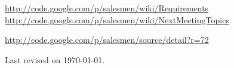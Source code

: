 \documentclass[a4paper, 12pt]{article}
\begin{document}
			
		
	
	
	\begin{thebibliography}{99}
		\href{http://code.google.com/p/salesmen/wiki/Requirements}{http://code.google.com/p/salesmen/wiki/Requirements}
		\href{http://code.google.com/p/salesmen/wiki/NextMeetingTopics}{http://code.google.com/p/salesmen/wiki/NextMeetingTopics}
		
		\href{http://code.google.com/p/salesmen/source/detail?r=72}{http://code.google.com/p/salesmen/source/detail?r=72}
		

		
	\end{thebibliography}	
	
	\begin{center}
	 	Last revised on \today.
	\end{center}
	
	
\end{document}
